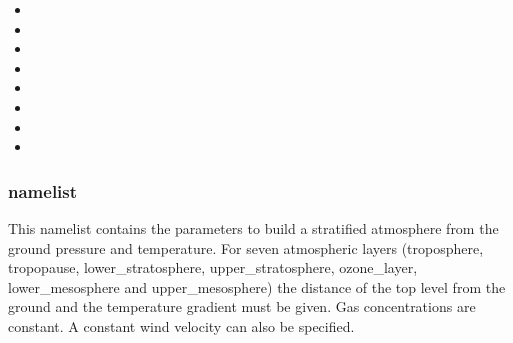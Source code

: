 \begin{itemize}
\item
{}

\item
{}

\item
{}

\item
{}

\item
{}

\item
{}

\item
{}

\item
{}
\end{itemize}

\subsubsection{ namelist}
This namelist contains the parameters to build a stratified atmosphere from
the ground pressure and temperature. For seven atmospheric layers (troposphere,
tropopause, lower\_stratosphere, upper\_stratosphere, ozone\_layer, lower\_mesosphere and upper\_mesosphere) the distance of the top level from the ground and the temperature gradient must be given. Gas concentrations are constant. A constant wind velocity can also be specified.

